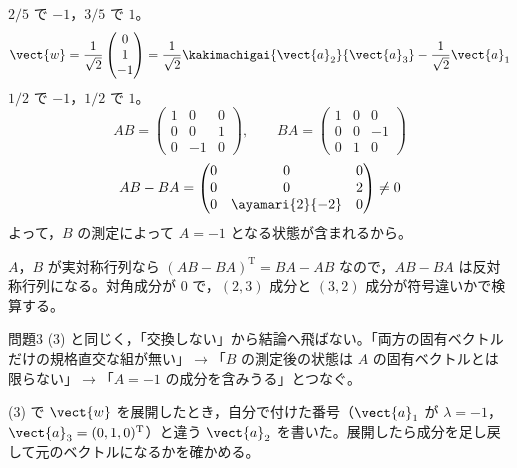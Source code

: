 $2/5$ で $-1$，$3/5$ で $1$。
\[ \vect{w}=\frac{1}{\sqrt{2}}\begin{pmatrix}0\\1\\-1\end{pmatrix}=\frac{1}{\sqrt{2}}\kakimachigai{\vect{a}_{2}}{\vect{a}_{3}}-\frac{1}{\sqrt{2}}\vect{a}_{1} \]
$1/2$ で $-1$，$1/2$ で $1$。
\[ AB=\begin{pmatrix}1&0&0\\0&0&1\\0&-1&0\end{pmatrix},\qquad BA=\begin{pmatrix}1&0&0\\0&0&-1\\0&1&0\end{pmatrix} \]
\[ AB-BA=\begin{pmatrix}0&0&0\\0&0&2\\0&\ayamari{2}{-2}&0\end{pmatrix}\neq0 \]
よって，$B$ の測定によって $A=-1$ となる状態が含まれるから。
\item $A$，$B$ が実対称行列なら $(AB-BA)^{\mathrm{T}}=BA-AB$ なので，$AB-BA$ は反対称行列になる。対角成分が $0$ で，$(2,3)$ 成分と $(3,2)$ 成分が符号違いかで検算する。
\item 問題3 (3) と同じく，「交換しない」から結論へ飛ばない。「両方の固有ベクトルだけの規格直交な組が無い」$\to$「$B$ の測定後の状態は $A$ の固有ベクトルとは限らない」$\to$「$A=-1$ の成分を含みうる」とつなぐ。
\item (3) で $\vect{w}$ を展開したとき，自分で付けた番号（$\vect{a}_{1}$ が $\lambda=-1$，$\vect{a}_{3}=(0,1,0)^{\mathrm{T}}$）と違う $\vect{a}_{2}$ を書いた。展開したら成分を足し戻して元のベクトルになるかを確かめる。
